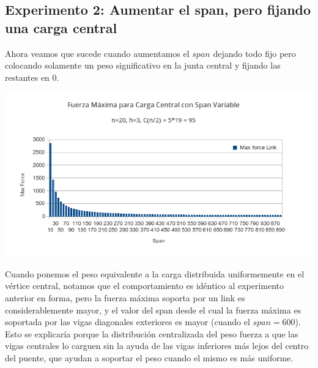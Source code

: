 \subsection{Experimento 2: Aumentar el span, pero fijando una carga central}

Ahora veamos que sucede cuando aumentamos el $span$ dejando todo fijo pero colocando solamente un peso significativo en la junta central y fijando las restantes en 0.

\begin{center}
\includegraphics[scale=0.8]{archivos/graficos/Fuerza-x-span-peso-central.png}\\
\end{center}

Cuando ponemos el peso equivalente a la carga distribuida uniformemente en el vértice central, notamos que el comportamiento es idéntico al experimento anterior en forma, pero la fuerza máxima soporta por un link es considerablemente mayor, y el valor del span desde el cual la fuerza máxima es soportada por las vigas diagonales exteriores es mayor (cuando el $span = 600$).\\

Esto se explicaría porque la distribución centralizada del peso fuerza a que las vigas centrales lo carguen sin la ayuda de las vigas inferiores más lejos del centro del puente, que ayudan a soportar el peso cuando el mismo es más uniforme.

